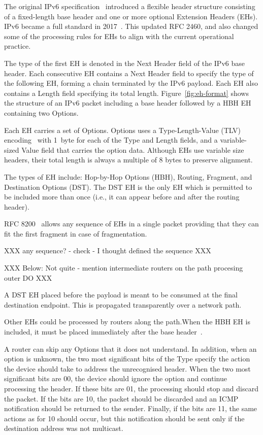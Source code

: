 \documentclass[conference]{IEEEtran}
\begin{document}
The original IPv6 specification~\cite{rfc2460} introduced a flexible header structure consisting of a
fixed-length base header and one or more optional Extension Headers (EHs). IPv6 became a full standard in 2017~\cite{RFC8200}. This updated RFC 2460, and also changed some of the processing rules for EHs to align with the current operational practice.

The type of the first EH is denoted in the Next Header field of the IPv6 base header. Each consecutive EH contains a Next Header field to specify the type of the following EH, forming a chain terminated by the IPv6 payload. Each EH also contains a Length field specifying its total length. Figure~\ref{fig:eh-format} shows the structure of an IPv6 packet including a base header followed by a HBH EH containing two Options.

Each EH carries a set of Options. Options uses a Type-Length-Value (TLV) encoding~\cite{RFC8200} with 1~byte for each of the Type and Length fields, and a variable-sized Value field that carries the option data. Although EHs use variable size headers, their total length is always a multiple of 8 bytes to preserve alignment.

The types of EH include: Hop-by-Hop Options (HBH), Routing, Fragment, and
Destination Options (DST). The DST EH is the only EH which is permitted to be included more than once (i.e., it can appear before and after the routing header).

RFC 8200~\cite{RFC8200} allows any sequence of EHs in a single packet providing that they can fit the first fragment in case of fragmentation.

XXX any sequence? - check - I thought defined the sequence XXX 

XXX Below: Not quite - mention  intermediate routers on the path procesing outer DO XXX

A DST EH placed before the payload is meant to be consumed at the final destination endpoint. This is propagated transparently over a network path.

Other EHs could be processed by routers along the path.When the HBH EH is included, it must be placed immediately after the base header~\cite{RFC8200}.

A router can skip any Options that it does not understand. In addition, when an option is unknown, the two most significant bits of the Type
specify the action the device should take to address the unrecognised header. When the two most significant bits are 00, the device should
ignore the option and continue processing the header. If these bits are 01, the
processing should stop and discard the packet. If the bits are 10,
the packet should be discarded and an ICMP notification should be returned to
the sender. Finally, if the bits are 11, the same actions as for 10 should occur,
but this notification should be sent only if the destination address was not multicast. 
\end{document}
